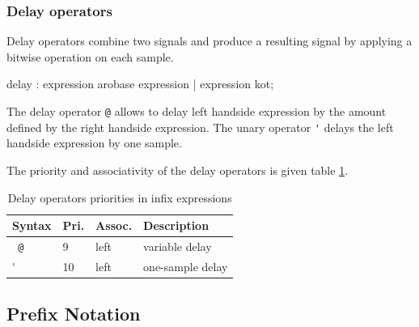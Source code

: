 \subsubsection{Delay operators}

Delay operators combine two signals and produce a resulting signal by applying a bitwise operation on each sample. 

\begin{rail}
	delay : expression arobase expression | expression kot;
\end{rail}

The delay operator \lstinline'@' allows to delay left handside expression by the amount defined by the right handside expression. The unary operator \lstinline"'" delays the left handside expression by one sample.  

The priority and associativity of the delay operators is given table \ref{infix-delay-priority}.

\begin{table}[ht]
	\centering
	\begin{tabular}{|l|l|l|l|}
		\hline
		\textbf{Syntax} & \textbf{Pri.}  & \textbf{Assoc.}  & \textbf{Description}  \\
		\hline
		\texttt{\farg{expression}\ @\ \farg{expression}}	& 9 & left & variable delay        \\
		\texttt{\farg{expression}} \'					& 10 & left & one-sample delay  \\
		\hline
	\end{tabular}
	\caption{Delay operators priorities in infix expressions}   
  	\label{infix-delay-priority}
\end{table}


\subsection{Prefix Notation}

